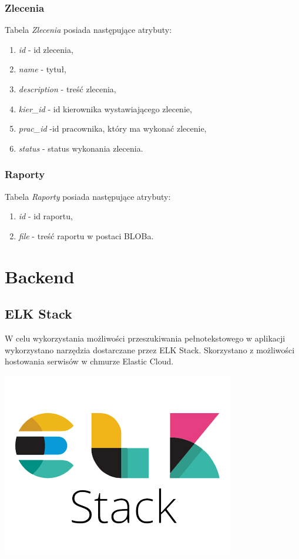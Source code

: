 \documentclass[]{article}
\begin{document}
    \subsubsection{Zlecenia}
    Tabela \textit{Zlecenia} posiada następujące atrybuty:
    \begin{enumerate}
        \item \textit{id} - id zlecenia,
        \item \textit{name} - tytuł,
        \item \textit{description} - treść zlecenia,
        \item \textit{kier\_id} - id kierownika wystawiającego zlecenie,
        \item \textit{prac\_id} -id pracownika, który ma wykonać zlecenie,
        \item \textit{status} - status wykonania zlecenia.
    \end{enumerate}


    \subsubsection{Raporty}
    Tabela \textit{Raporty} posiada następujące atrybuty:
    \begin{enumerate}
        \item \textit{id} - id raportu,
        \item \textit{file} - treść raportu w postaci BLOBa.
    \end{enumerate}



    \section{Backend}
    \subsection{ELK Stack}
    W celu wykorzystania możliwości przeszukiwania pełnotekstowego w aplikacji wykorzystano narzędzia dostarczane przez ELK Stack. Skorzystano z możliwości hostowania serwisów w chmurze Elastic Cloud.

    \begin{center}
        \includegraphics[scale=0.4]{elk-stack-logo.png}
    \end{center}
\end{document}

